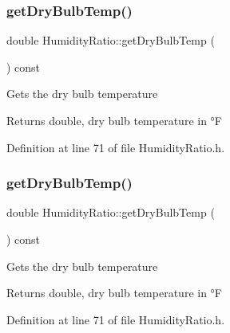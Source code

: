 \subsubsection{\texorpdfstring{get\+Dry\+Bulb\+Temp()}{getDryBulbTemp()}\hspace{0.1cm}{\footnotesize\ttfamily [2/3]}}
{\footnotesize\ttfamily double Humidity\+Ratio\+::get\+Dry\+Bulb\+Temp (\begin{DoxyParamCaption}{ }\end{DoxyParamCaption}) const\hspace{0.3cm}{\ttfamily [inline]}}

Gets the dry bulb temperature

\begin{DoxyReturn}{Returns}
double, dry bulb temperature in °F 
\end{DoxyReturn}


Definition at line 71 of file Humidity\+Ratio.\+h.

\mbox{\label{class_humidity_ratio_a737b2faf32e5271b8062b175e1d018a9}} 
\subsubsection{\texorpdfstring{get\+Dry\+Bulb\+Temp()}{getDryBulbTemp()}\hspace{0.1cm}{\footnotesize\ttfamily [3/3]}}
{\footnotesize\ttfamily double Humidity\+Ratio\+::get\+Dry\+Bulb\+Temp (\begin{DoxyParamCaption}{ }\end{DoxyParamCaption}) const\hspace{0.3cm}{\ttfamily [inline]}}

Gets the dry bulb temperature

\begin{DoxyReturn}{Returns}
double, dry bulb temperature in °F 
\end{DoxyReturn}


Definition at line 71 of file Humidity\+Ratio.\+h.

\mbox{\label{class_humidity_ratio_af711463f09fa91544c2b69dc24817fed}} 
